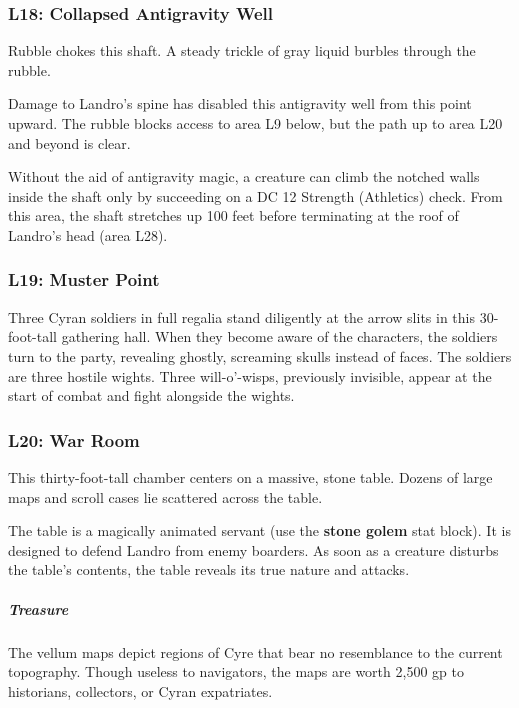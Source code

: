 \documentclass[10pt,a4paper,twoside,bg=print,twocolumn,openany,nodeprecatedcode]{dndbook}
\begin{document}
\subsubsection{L18: Collapsed Antigravity Well}
\begin{DndReadAloud}{}
Rubble chokes this shaft. A steady trickle of gray liquid burbles through the rubble.

\end{DndReadAloud}

Damage to Landro's spine has disabled this antigravity well from this point upward. The rubble blocks access to area L9 below, but the path up to area L20 and beyond is clear.

Without the aid of antigravity magic, a creature can climb the notched walls inside the shaft only by succeeding on a DC 12 Strength (Athletics) check. From this area, the shaft stretches up 100 feet before terminating at the roof of Landro's head (area L28).

\subsubsection{L19: Muster Point}
Three Cyran soldiers in full regalia stand diligently at the arrow slits in this 30-foot-tall gathering hall. When they become aware of the characters, the soldiers turn to the party, revealing ghostly, screaming skulls instead of faces. The soldiers are three hostile wights. Three will-o'-wisps, previously invisible, appear at the start of combat and fight alongside the wights.

\subsubsection{L20: War Room}
\begin{DndReadAloud}{}
This thirty-foot-tall chamber centers on a massive, stone table. Dozens of large maps and scroll cases lie scattered across the table.

\end{DndReadAloud}

The table is a magically animated servant (use the \textbf{stone golem} stat block). It is designed to defend Landro from enemy boarders. As soon as a creature disturbs the table's contents, the table reveals its true nature and attacks.

\subparagraph{Treasure}
The vellum maps depict regions of Cyre that bear no resemblance to the current topography. Though useless to navigators, the maps are worth 2,500 gp to historians, collectors, or Cyran expatriates.
\end{document}
